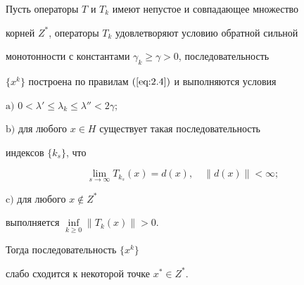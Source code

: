 \begin{prop} \label{pro:2.2}


Пусть операторы $T$ и $T_{k}$ имеют непустое и совпадающее множество 


корней $Z^*$, операторы $T_{k}$ удовлетворяют условию обратной сильной 


монотонности с константами $\gamma_{k} \geq \gamma > 0$, последовательность 


$\{x^{k}\}$ построена по правилам $(\ref{eq:2.4})$ и выполняются условия





$\mathrm{a)}$ $0 < \lambda' \leq \lambda_{k} \leq \lambda'' < 2 \gamma;$





$\mathrm{b)}$ для любого $x \in H$ существует такая последовательность


индексов $\{k_{s} \}$, что 


$$


\lim_{s\rightarrow\infty} T_{k_{s}} (x)=d(x), \quad \| d(x) \| < \infty ;


$$





$\mathrm{c)}$ для любого $x \notin Z^*$ 


выполняется $\inf\limits_{k \geq 0} \| T_{k} (x) \| > 0$.





Тогда последовательность $\{x^{k} \}$


слабо сходится к некоторой точке $x^* \in Z^*$.


\end{prop}





